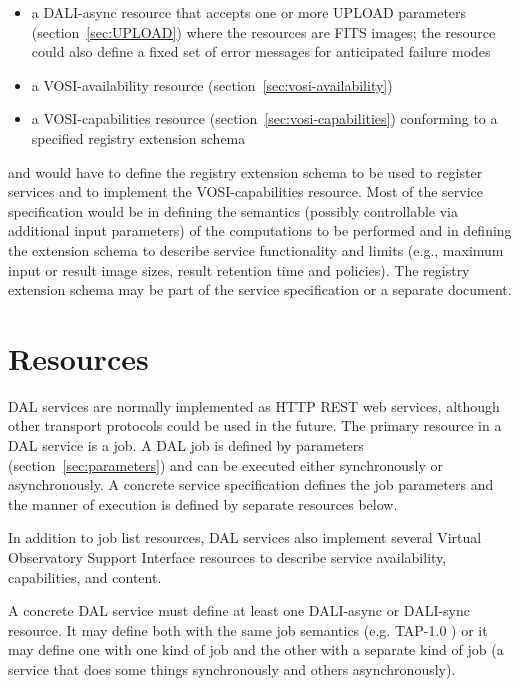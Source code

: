 \documentclass[11pt,letter]{ivoa}
\begin{document}
\begin{itemize}
\item a DALI-async resource that accepts one or more UPLOAD parameters 
(section~\ref{sec:UPLOAD}) where the resources are FITS images; the resource 
could also define a fixed set of error messages for anticipated failure modes 

\item a VOSI-availability resource (section~\ref{sec:vosi-availability}) 

\item a VOSI-capabilities resource (section~\ref{sec:vosi-capabilities}) conforming 
to a specified registry extension schema 
\end{itemize}

and would have to define the registry extension schema to be used to register 
services and to implement the VOSI-capabilities resource. Most of the service 
specification would be in defining the semantics (possibly controllable via 
additional input parameters) of the computations to be performed and in defining 
the extension schema to describe service functionality and limits (e.g., maximum 
input or result image sizes, result retention time and policies). The registry 
extension schema may be part of the service specification or a separate 
document.

\section{Resources}
\label{sec:resources}
DAL services are normally implemented as HTTP REST \citep{fielding00} 
web services, although 
other transport protocols could be used in the future. The primary resource in 
a DAL service is a job. A DAL job is defined by parameters 
(section~\ref{sec:parameters}) and 
can be executed either synchronously or asynchronously. A concrete service 
specification defines the job parameters and the manner of execution is defined 
by separate resources below.

In addition to job list resources, DAL services also implement several Virtual 
Observatory Support Interface \citep{std:VOSI} resources to describe 
service availability, capabilities, and content.

A concrete DAL service must define at least one DALI-async or DALI-sync 
resource. It may define both with the same job semantics (e.g. TAP-1.0 
\citep{std:TAP}) or it may define one with one kind of job and the other with a 
separate kind of job (a service that does some things synchronously and others 
asynchronously). 
\end{document}
